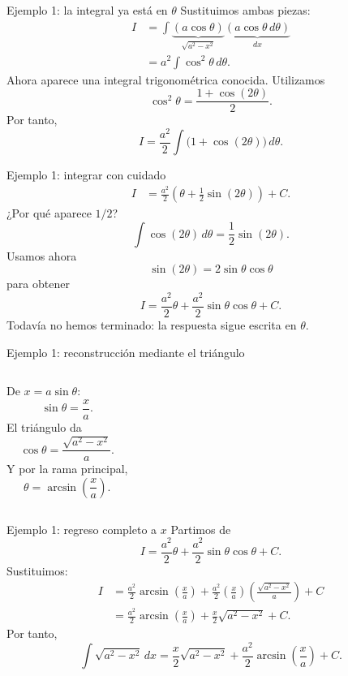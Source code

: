 \documentclass[10pt,aspectratio=169]{beamer}
\begin{document}
\begin{frame}{Ejemplo 1: la integral ya está en $\theta$}
Sustituimos ambas piezas:
\begin{align*}
I
&=\int \underbrace{(a\cos\theta)}_{\sqrt{a^2-x^2}}
\underbrace{(a\cos\theta\,d\theta)}_{dx}\\
&=a^2\int\cos^2\theta\,d\theta.
\end{align*}
Ahora aparece una integral trigonométrica conocida. Utilizamos
\[
\cos^2\theta=\frac{1+\cos(2\theta)}{2}.
\]
Por tanto,
\[
I=\frac{a^2}{2}\int\bigl(1+\cos(2\theta)\bigr)\,d\theta.
\]
\end{frame}

\begin{frame}{Ejemplo 1: integrar con cuidado}
\begin{align*}
I
&=\frac{a^2}{2}\left(\theta+\frac12\sin(2\theta)\right)+C.
\end{align*}
¿Por qué aparece $1/2$?
\[
\int\cos(2\theta)\,d\theta=\frac12\sin(2\theta).
\]
Usamos ahora
\[
\sin(2\theta)=2\sin\theta\cos\theta
\]
para obtener
\[
\boxed{I=\frac{a^2}{2}\theta+
\frac{a^2}{2}\sin\theta\cos\theta+C.}
\]
Todavía no hemos terminado: la respuesta sigue escrita en $\theta$.
\end{frame}

\begin{frame}{Ejemplo 1: reconstrucción mediante el triángulo}
\begin{columns}[T]
De $x=a\sin\theta$:
\[
\sin\theta=\frac{x}{a}.
\]
El triángulo da
\[
\cos\theta=\frac{\sqrt{a^2-x^2}}{a}.
\]
Y por la rama principal,
\[
\theta=\arcsin\left(\frac{x}{a}\right).
\]
\centering
{}
\end{columns}
\end{frame}

\begin{frame}{Ejemplo 1: regreso completo a $x$}
Partimos de
\[
I=\frac{a^2}{2}\theta+\frac{a^2}{2}\sin\theta\cos\theta+C.
\]
Sustituimos:
\begin{align*}
I
&=\frac{a^2}{2}\arcsin\left(\frac{x}{a}\right)
+\frac{a^2}{2}\left(\frac{x}{a}\right)
\left(\frac{\sqrt{a^2-x^2}}{a}\right)+C\\
&=\frac{a^2}{2}\arcsin\left(\frac{x}{a}\right)
+\frac{x}{2}\sqrt{a^2-x^2}+C.
\end{align*}
Por tanto,
\[
\boxed{\int\sqrt{a^2-x^2}\,dx=
\frac{x}{2}\sqrt{a^2-x^2}+
\frac{a^2}{2}\arcsin\left(\frac{x}{a}\right)+C.}
\]
\end{frame}
\end{document}
